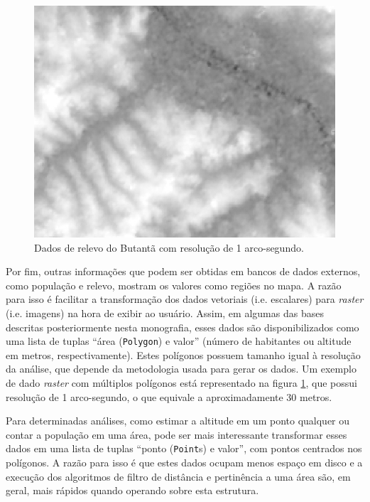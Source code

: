 \documentclass[]{politex}
\begin{document}
\begin{figure}[H]
    \centering
    \includegraphics[width=6in]{imagens/dados-relevo-30m}
    \caption{Dados de relevo do Butantã com resolução de 1 arco-segundo.}
    \label{fig:map_altitude_polygons}
\end{figure}

Por fim, outras informações que podem ser obtidas em bancos de dados externos,
como população e relevo, mostram os valores como regiões no mapa. A razão para
isso é facilitar a transformação dos dados vetoriais (i.e. escalares) para
\textit{raster} (i.e. imagens) na hora de exibir ao usuário. Assim, em algumas
das bases descritas posteriormente nesta monografia, esses dados são
disponibilizados como uma lista de tuplas ``área (\texttt{Polygon}) e valor''
(número de habitantes ou altitude em metros, respectivamente). Estes polígonos
possuem tamanho igual à resolução da análise, que depende da metodologia usada
para gerar os dados. Um exemplo de dado \textit{raster} com múltiplos polígonos
está representado na figura \ref{fig:map_altitude_polygons}, que possui
resolução de 1 arco-segundo, o que equivale a aproximadamente 30 metros.

Para determinadas análises, como estimar a altitude em um ponto qualquer ou
contar a população em uma área, pode ser mais interessante transformar esses
dados em uma lista de tuplas ``ponto (\texttt{Point}s) e valor'', com pontos
centrados nos polígonos. A razão para isso é que estes dados ocupam menos espaço
em disco e a execução dos algoritmos de filtro de distância e pertinência a uma
área são, em geral, mais rápidos quando operando sobre esta estrutura.
\end{document}
